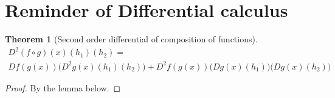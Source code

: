 \documentclass{report}
\newtheorem{theo}{Theorem}[section]
\begin{document}
\newpage
%

\section*{Reminder of Differential calculus}

\begin{theo}[Second order differential of composition of functions]

\begin{multline*}
    D^2(f \circ g)(x)(h_1)(h_2) = \\ Df(g(x))\big(D^2g(x)(h_1)(h_2)\big) + D^2f(g(x))\big(Dg(x)(h_1)\big)\big(Dg(x)(h_2)\big)
\end{multline*}

\end{theo}
\begin{proof}
By the lemma below.
\end{proof}
\end{document}
